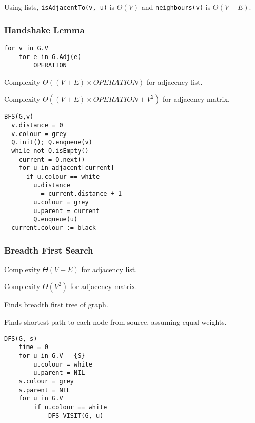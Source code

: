 \documentclass[10pt, a4paper,landscape]{article}
\begin{document}
\begin{multicols*}{4}
Using lists, \texttt{isAdjacentTo(v, u)} is $\Theta(V)$ and \texttt{neighbours(v)} is $\Theta(V + E)$.

\subsubsection{Handshake Lemma}
\begin{lstlisting}
for v in G.V
    for e in G.Adj(e)
        OPERATION
\end{lstlisting}
\begin{compactitem}
    \item[Complexity] $\Theta((V+E) \times OPERATION)$ for adjacency list.
    \item[Complexity] $\Theta((V+E) \times OPERATION + V^2)$ for adjacency matrix.
\end{compactitem}

\begin{lstlisting}
BFS(G,v)
  v.distance = 0 
  v.colour = grey 
  Q.init(); Q.enqueue(v)
  while not Q.isEmpty()
    current = Q.next()
    for u in adjacent[current]
      if u.colour == white
        u.distance 
          = current.distance + 1 
        u.colour = grey 
        u.parent = current 
        Q.enqueue(u)
  current.colour := black
\end{lstlisting}

\subsubsection{Breadth First Search}
\begin{compactitem}
    \item[Complexity] $\Theta(V+E)$ for adjacency list.
    \item[Complexity] $\Theta(V^2)$ for adjacency matrix.
    \item[Finds] breadth first tree of graph.
    \item[Finds] shortest path to each node from source, assuming equal weights.
\end{compactitem}

\begin{lstlisting}
DFS(G, s)
    time = 0
    for u in G.V - {S}
        u.colour = white
        u.parent = NIL
    s.colour = grey
    s.parent = NIL
    for u in G.V
        if u.colour == white
            DFS-VISIT(G, u)


\end{lstlisting}
\end{multicols*}
\end{document}
